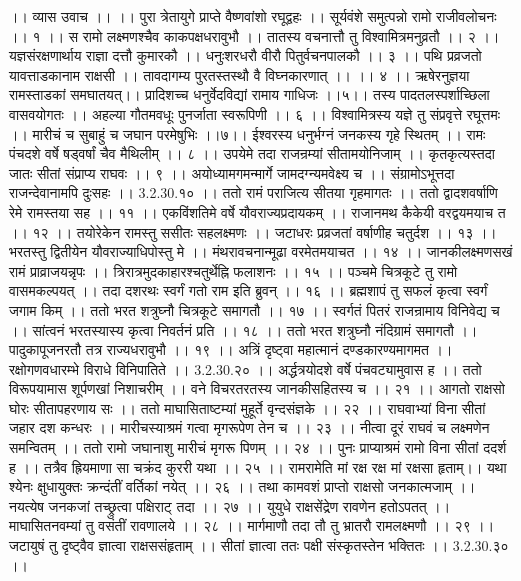 ।। व्यास उवाच ।। ।।
पुरा त्रेतायुगे प्राप्ते वैष्णवांशो रघूद्वहः ।।
सूर्यवंशे समुत्पन्नो रामो राजीवलोचनः ।। १ ।।
स रामो लक्ष्मणश्चैव काकपक्षधरावुभौ ।।
तातस्य वचनात्तौ तु विश्वामित्रमनुव्रतौ ।। २ ।।
यज्ञसंरक्षणार्थाय राज्ञा दत्तौ कुमारकौ ।।
धनुःशरधरौ वीरौ पितुर्वचनपालकौ ।। ३ ।।
पथि प्रव्रजतो यावत्ताडकानाम राक्षसी ।।
तावदागम्य पुरतस्तस्थौ वै विघ्नकारणात् ।। ।। ४ ।।
ऋषेरनुज्ञया रामस्ताडकां समघातयत्।।
प्रादिशच्च धनुर्वेदविद्यां रामाय गाधिजः ।।५।।
तस्य पादतलस्पर्शाच्छिला वासवयोगतः ।।
अहल्या गौतमवधूः पुनर्जाता स्वरूपिणी ।। ६ ।।
विश्वामित्रस्य यज्ञे तु संप्रवृत्ते रघूत्तमः ।।
मारीचं च सुबाहुं च जघान परमेषुभिः ।।७।।
ईश्वरस्य धनुर्भग्नं जनकस्य गृहे स्थितम् ।।
रामः पंचदशे वर्षे षड्वर्षां चैव मैथिलीम् ।। ८ ।।
उपयेमे तदा राजन्रम्यां सीतामयोनिजाम् ।।
कृतकृत्यस्तदा जातः सीतां संप्राप्य राघवः ।। ९ ।।
अयोध्यामगमन्मार्गे जामदग्न्यमवेक्ष्य च ।।
संग्रामोऽभूत्तदा राजन्देवानामपि दुःसहः ।। 3.2.30.१० ।।
ततो रामं पराजित्य सीतया गृहमागतः ।।
ततो द्वादशवर्षाणि रेमे रामस्तया सह ।। ११ ।।
एकविंशतिमे वर्षे यौवराज्यप्रदायकम् ।।
राजानमथ कैकेयी वरद्वयमयाच त ।। १२ ।।
तयोरेकेन रामस्तु ससीतः सहलक्ष्मणः ।।
जटाधरः प्रव्रजतां वर्षाणीह चतुर्दश ।। १३ ।।
भरतस्तु द्वितीयेन यौवराज्याधिपोस्तु मे ।।
मंथरावचनान्मूढा वरमेतमयाचत ।। १४ ।।
जानकीलक्ष्मणसखं रामं प्राव्राजयन्नृपः ।।
त्रिरात्रमुदकाहारश्चतुर्थेह्नि फलाशनः ।। १५ ।।
पञ्चमे चित्रकूटे तु रामो वासमकल्पयत् ।।
तदा दशरथः स्वर्गं गतो राम इति ब्रुवन् ।। १६ ।।
ब्रह्मशापं तु सफलं कृत्वा स्वर्गं जगाम किम् ।।
ततो भरत शत्रुघ्नौ चित्रकूटे समागतौ ।। १७ ।।
स्वर्गतं पितरं राजन्रामाय विनिवेद्य च ।।
सांत्वनं भरतस्यास्य कृत्वा निवर्तनं प्रति ।। १८ ।।
ततो भरत शत्रुघ्नौ नंदिग्रामं समागतौ ।।
पादुकापूजनरतौ तत्र राज्यधरावुभौ ।। १९ ।।
अत्रिं दृष्ट्वा महात्मानं दण्डकारण्यमागमत ।।
रक्षोगणवधारम्भे विराधे विनिपातिते ।। 3.2.30.२० ।।
अर्द्धत्रयोदशे वर्षे पंचवट्यामुवास ह ।।
ततो विरूपयामास शूर्पणखां निशाचरीम् ।।
वने विचरतरतस्य जानकीसहितस्य च ।। २१ ।।
आगतो राक्षसो घोरः सीतापहरणाय सः ।।
ततो माघासिताष्टम्यां मुहूर्ते वृन्दसंज्ञके ।। २२ ।।
राघवाभ्यां विना सीतां जहार दश कन्धरः ।।
मारीचस्याश्रमं गत्वा मृगरूपेण तेन च ।। २३ ।।
नीत्वा दूरं राघवं च लक्ष्मणेन समन्वितम् ।।
ततो रामो जघानाशु मारीचं मृगरू पिणम् ।। २४ ।।
पुनः प्राप्याश्रमं रामो विना सीतां ददर्श ह ।।
तत्रैव ह्रियमाणा सा चक्रंद कुररी यथा ।। २५ ।।
रामरामेति मां रक्ष रक्ष मां रक्षसा हृताम्।।
यथा श्येनः क्षुधायु्क्तः क्रन्दंतीं वर्तिकां नयेत् ।। २६ ।।
तथा कामवशं प्राप्तो राक्षसो जनकात्मजाम् ।।
नयत्येष जनकजां तच्छ्रुत्वा पक्षिराट् तदा ।। २७ ।।
युयुधे राक्षसेंद्रेण रावणेन हतोऽपतत् ।।
माघासितनवम्यां तु वसंतीं रावणालये ।। २८ ।।
मार्गमाणौ तदा तौ तु भ्रातरौ रामलक्ष्मणौ ।। २९ ।।
जटायुषं तु दृष्ट्वैव ज्ञात्वा राक्षससंहृताम् ।।
सीतां ज्ञात्वा ततः पक्षी संस्कृतस्तेन भक्तितः ।। 3.2.30.३० ।।
